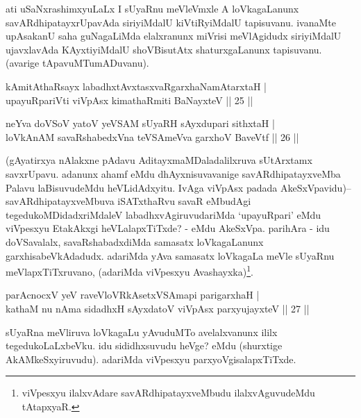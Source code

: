 \begin{artha} 
ati uSaNxrashimxyuLaLx I sUyaRnu meVleVmxle A loVkagaLanunx 
savARdhipatayxrUpavAda siriyiMdalU kiVtiRyiMdalU tapisuvanu. ivanaMte 
upAsakanU saha guNagaLiMda elalxranunx miVrisi meVlAgidudx siriyiMdalU 
ujavxlavAda KAyxtiyiMdalU shoVBisutAtx shaturxgaLanunx tapisuvanu. 
(avarige tApavuMTumADuvanu).
\end{artha}


\begin{shl}
kAmitAthaRsayx labadhxtAvxtasxvaRgarxhaNamAtarxtaH | \\
upayuRpariVti viVpAsx kimathaRmiti BaNayxteV \hfill ||  25 || 
\end{shl}

\begin{shl}
neYva doVSoV yatoV yeVSAM sUyaRH sAyxdupari sithxtaH | \\
loVkAnAM savaRshabedxVna teVSAmeVva garxhoV BaveVtf \hfill ||  26 || 
\end{shl}

\begin{artha} 
(gAyatirxya nAlakxne pAdavu AditayxmaMDaladalilxruva sUtArxtamx 
savxrUpavu. adanunx ahamf eMdu dhAyxnisuvavanige savARdhipatayxveMba 
Palavu laBisuvudeMdu heVLidAdxyitu. IvAga viVpAsx padada 
AkeSxVpavidu){\rm --} savARdhipatayxveMbuva iSATxthaRvu savaR eMbudAgi 
tegedukoMDidadxriMdaleV labadhxvAgiruvudariMda `upayuRpari' eMdu 
viVpesxyu EtakAkxgi heVLalapxTiTxde? - eMdu AkeSxVpa. parihAra - idu 
doVSavalalx, savaRshabadxdiMda samasatx loVkagaLanunx 
garxhisabeVkAdadudx. adariMda yAva samasatx loVkagaLa meVle sUyaRnu 
meVlapxTiTxruvano, (adariMda viVpesxyu 
Avashayxka)\footnote{viVpesxyu ilalxvAdare savARdhipatayxveMbudu 
ilalxvAguvudeMdu tAtapxyaR.}.
\end{artha}


\begin{shl}
parAcnocxV yeV raveVloVRkAsetxVSAmapi parigarxhaH | \\
kathaM nu nAma sidadhxH sAyxdatoV viVpAsx parxyujayxteV \hfill ||  27 || 
\end{shl}

\begin{artha} 
sUyaRna meVliruva loVkagaLu yAvuduMTo avelalxvanunx ililx 
tegedukoLaLxbeVku. idu sididhxsuvudu heVge? eMdu (shurxtige 
AkAMkeSxyiruvudu). adariMda viVpesxyu parxyoVgisalapxTiTxde.
\end{artha}

